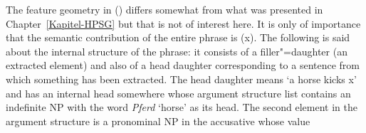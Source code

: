 \eanoraggedright
{}
\z
The feature geometry in () differs somewhat from what was presented in Chapter~\ref{Kapitel-HPSG} but that is not of interest here.
It is only of importance that the semantic contribution of the entire phrase is (x).
The following is said about the internal structure of the phrase: it consists of a filler"=daughter (an extracted element) and also
of a head daughter corresponding to a sentence from which something has been extracted. The head
daughter means `a horse kicks x' and has an internal head somewhere whose argument structure list contains an indefinite NP with the word
  \emph{Pferd} `horse' as its head. The second element in the argument structure is a pronominal NP in the accusative whose \local value
